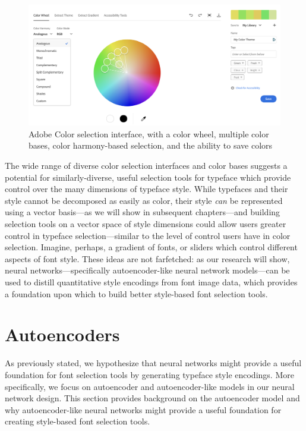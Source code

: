 \begin{figure}[]
    \centering
    \includegraphics[width=\textwidth]{images/adobe-color.png}
    \caption{Adobe Color selection interface, with a color wheel, multiple color bases, color harmony-based selection, and the ability to save colors}
    \label{fig:adobe-color}
\end{figure}

The wide range of diverse color selection interfaces and color bases suggests a potential for similarly-diverse, useful selection tools for typeface which provide control over the many dimensions of typeface style. While typefaces and their style cannot be decomposed as easily as color, their style \emph{can} be represented using a vector basis---as we will show in subsequent chapters---and building selection tools on a vector space of style dimensions could allow users greater control in typeface selection---similar to the level of control users have in color selection. Imagine, perhaps, a gradient of fonts, or sliders which control different aspects of font style. These ideas are not farfetched: as our research will show, neural networks---specifically autoencoder-like neural network models---can be used to distill quantitative style encodings from font image data, which provides a foundation upon which to build better style-based font selection tools.

\section{Autoencoders}

As previously stated, we hypothesize that neural networks might provide a useful foundation for font selection tools by generating typeface style encodings. More specifically, we focus on autoencoder and autoencoder-like models in our neural network design. This section provides background on the autoencoder model and why autoencoder-like neural networks might provide a useful foundation for creating style-based font selection tools.

